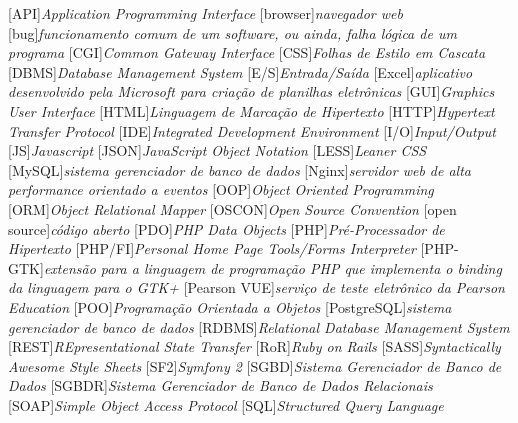 
			[API]{\textit{Application Programming Interface}}
		[browser]{\textit{navegador web}}
			[bug]{\textit{funcionamento comum de um software, ou ainda, falha
lógica de um programa}}
			[CGI]{\textit{Common Gateway Interface }}
			[CSS]{\textit{Folhas de Estilo em Cascata}}
			[DBMS]{\textit{Database Management System}}
			[E/S]{\textit{Entrada/Saída}}
		[Excel]{\textit{aplicativo desenvolvido pela Microsoft para
criação de planilhas eletrônicas}}
			[GUI]{\textit{Graphics User Interface}}
			[HTML]{\textit{Linguagem de Marcação de Hipertexto}}
			[HTTP]{\textit{Hypertext Transfer Protocol}}
			[IDE]{\textit{Integrated Development Environment}}
			[I/O]{\textit{Input/Output}}
			[JS]{\textit{Javascript}}
			[JSON]{\textit{JavaScript Object Notation}}
			[LESS]{\textit{Leaner CSS}}
		[MySQL]{\textit{sistema gerenciador de banco de dados}}
		[Nginx]{\textit{servidor web de alta performance orientado a
eventos}}
			[OOP]{\textit{Object Oriented Programming}}
			[ORM]{\textit{Object Relational Mapper}}
		[OSCON]{\textit{Open Source Convention}}
	[open source]{\textit{código aberto}}
			[PDO]{\textit{‎PHP Data Objects}}
			[PHP]{\textit{Pré-Processador de Hipertexto}}
		[PHP/FI]{\textit{Personal Home Page Tools/Forms Interpreter}}
		[PHP-GTK]{\textit{extensão para a linguagem de programação PHP
que implementa o binding da linguagem para o GTK+}}
	[Pearson VUE]{\textit{serviço de teste eletrônico da Pearson Education}}
			[POO]{\textit{Programação Orientada a Objetos}}
	[PostgreSQL]{\textit{sistema gerenciador de banco de dados}}
		[RDBMS]{\textit{Relational Database Management System}}
			[REST]{\textit{REpresentational State Transfer}}
			[RoR]{\textit{Ruby on Rails}}
			[SASS]{\textit{Syntactically Awesome Style Sheets}}
			[SF2]{\textit{Symfony 2}}
			[SGBD]{\textit{Sistema Gerenciador de Banco de Dados}}
		[SGBDR]{\textit{Sistema Gerenciador de Banco de Dados
Relacionais}}
			[SOAP]{\textit{Simple Object Access Protocol}}
			[SQL]{\textit{Structured Query Language}}
